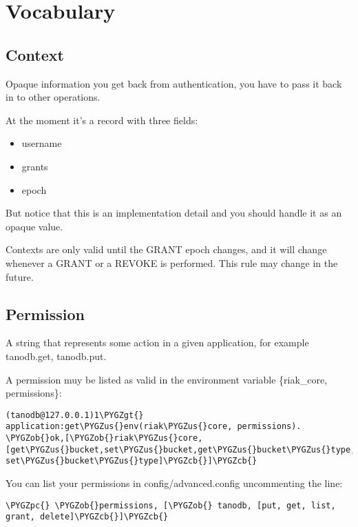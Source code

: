 \documentclass[letterpaper,10pt,english]{sphinxmanual}
\def\PYGZus{\char`\_}
\def\PYGZob{\char`\{}
\def\PYGZcb{\char`\}}
\def\PYGZgt{\char`\>}
\def\PYGZpc{\char`\%}
\begin{document}
\section{Vocabulary}
\label{riak_core_security:vocabulary}

\subsection{Context}
\label{riak_core_security:context}
Opaque information you get back from authentication, you have to pass it back
in to other operations.

At the moment it's a record with three fields:
\begin{itemize}
\item {} 
username

\item {} 
grants

\item {} 
epoch

\end{itemize}

But notice that this is an implementation detail and you should handle it
as an opaque value.

Contexts are only valid until the GRANT epoch changes, and it will change
whenever a GRANT or a REVOKE is performed. This rule may change in the future.


\subsection{Permission}
\label{riak_core_security:permission}
A string that represents some action in a given application, for example
tanodb.get, tanodb.put.

A permission muy be listed as valid in the environment variable \{riak\_core, permissions\}:

\begin{Verbatim}[commandchars=\\\{\}]
(tanodb@127.0.0.1)1\PYGZgt{} application:get\PYGZus{}env(riak\PYGZus{}core, permissions).
\PYGZob{}ok,[\PYGZob{}riak\PYGZus{}core,[get\PYGZus{}bucket,set\PYGZus{}bucket,get\PYGZus{}bucket\PYGZus{}type, set\PYGZus{}bucket\PYGZus{}type]\PYGZcb{}]\PYGZcb{}
\end{Verbatim}

You can list your permissions in config/advanced.config uncommenting the line:

\begin{Verbatim}[commandchars=\\\{\}]
\PYGZpc{} \PYGZob{}permissions, [\PYGZob{} tanodb, [put, get, list, grant, delete]\PYGZcb{}]\PYGZcb{}
\end{Verbatim}
\end{document}

